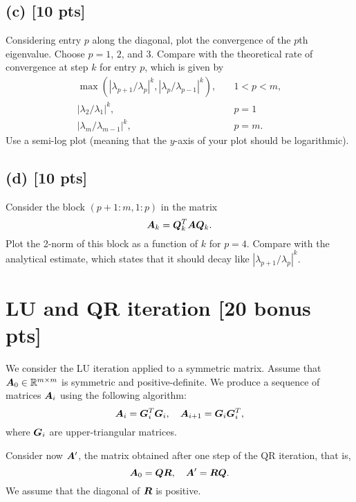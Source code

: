 \documentclass[twoside,10pt]{article}
\begin{document}
  \subsection*{(c) [10 pts]}
    Considering entry $p$ along the diagonal, plot the convergence of the $p$th eigenvalue. 
    Choose $p = 1$, $2$, and $3$.  
    Compare with the theoretical rate of convergence at step $k$ for entry $p$, which is given by 
    \begin{align}
      \max(|\lambda_{p + 1} / \lambda_p|^k, |\lambda_p / \lambda_{p -1}|^k), \quad &1 < p < m,\\
      |\lambda_2 / \lambda_1|^k, \quad &p = 1\\
      |\lambda_{m} / \lambda_{m -1}|^k, \quad &p = m.
    \end{align}
    Use a semi-log plot (meaning that the $y$-axis of your plot should be logarithmic). 
  
  \subsection*{(d) [10 pts]}
    Consider the block $(p + 1 : m, 1 : p)$ in the matrix 
    \begin{equation}
      \bm{A}_k = \bm{Q}^T_{k} \bm{A} \bm{Q}_{k}.
    \end{equation}
    Plot the 2-norm of this block as a function of $k$ for $p = 4$. Compare with the analytical estimate, which states that it should decay like $|\lambda_{p + 1} / \lambda_p|^k$.


\section{LU and QR iteration [20 bonus pts]}
We consider the LU iteration applied to a symmetric matrix. Assume that $\bm{A}_0 \in \mathbb{R}^{m \times m}$ is symmetric and positive-definite. 
We produce a sequence of matrices $\bm{A}_i$ using the following algorithm:
\begin{equation}
  \bm{A}_i = \bm{G}^T_i \bm{G}_i, \quad \bm{A}_{i + 1} = \bm{G}_i \bm{G}_i^T, 
\end{equation}
where $\bm{G}_i$ are upper-triangular matrices.

Consider now $\bm{A}'$, the matrix obtained after one step of the QR iteration, that is, 
\begin{equation}
  \bm{A}_0 = \bm{Q}\bm{R}, \quad \bm{A}' = \bm{R} \bm{Q}.
\end{equation}
We assume that the diagonal of $\bm{R}$ is positive.
\end{document}
